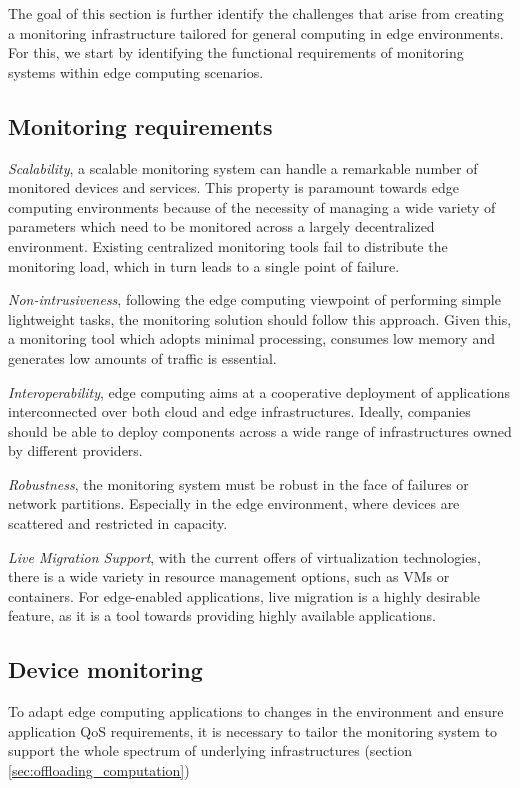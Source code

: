 
The goal of this section is further identify the challenges that arise from creating a monitoring infrastructure tailored for general computing in edge environments. For this, we start by identifying the functional requirements of monitoring systems within edge computing scenarios.

\subsection{Monitoring requirements}

\textit{Scalability}, a scalable monitoring system can handle a remarkable number of monitored devices and services. This property is paramount towards edge computing environments because of the necessity of managing a wide variety of parameters which need to be monitored across a largely decentralized environment. Existing centralized monitoring tools fail to distribute the monitoring load, which in turn leads to a single point of failure.

\textit{Non-intrusiveness}, following the edge computing viewpoint of performing simple lightweight tasks, the monitoring solution should follow this approach. Given this, a monitoring tool which adopts minimal processing, consumes low memory and generates low amounts of traffic is essential.

\textit{Interoperability}, edge computing aims at a cooperative deployment of applications interconnected over both cloud and edge infrastructures. Ideally, companies should be able to deploy components across a wide range of infrastructures owned by different providers.


\textit{Robustness}, the monitoring system must be robust in the face of failures or network partitions. Especially in the edge environment, where devices are scattered and restricted in capacity. 

\textit{Live Migration Support}, with the current offers of virtualization technologies, there is a wide variety in resource management options, such as VMs or containers. For edge-enabled applications, live migration is a highly desirable feature, as it is a tool towards providing highly available applications.

\subsection{Device monitoring}

To adapt edge computing applications to changes in the environment and ensure application QoS requirements, it is necessary to tailor the monitoring system to support the whole spectrum of underlying infrastructures (section \ref{sec:offloading_computation}) 






